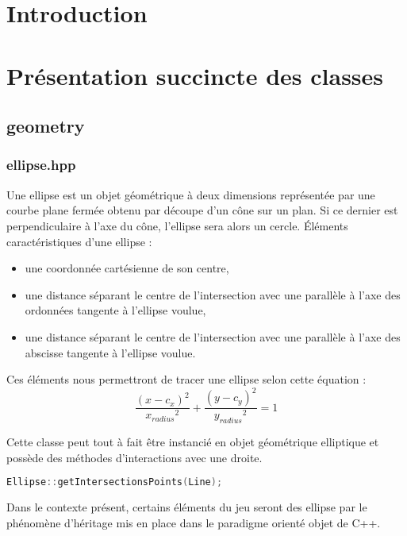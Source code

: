 \documentclass[a4paper,11pt]{report}
\begin{document}

\tableofcontents

\chapter{Introduction}



\chapter[Les classes]{Présentation succincte des classes}
\section[Les objets géométriques]{geometry}

\subsection[Ellipse]{ellipse.hpp}
\begin{center}
\end{center}
Une ellipse est un objet géométrique à deux dimensions représentée par
une courbe plane fermée obtenu par découpe d'un cône sur un plan. Si ce dernier
est perpendiculaire à l'axe du cône, l'ellipse sera alors un cercle.
Éléments caractéristiques d'une ellipse :
\begin{itemize}
	\item une coordonnée cartésienne de son centre,
	\item une distance séparant le centre de l'intersection avec une parallèle à
		l'axe des ordonnées tangente à l'ellipse voulue,
	\item une distance séparant le centre de l'intersection avec une parallèle à
		l'axe des abscisse tangente à l'ellipse voulue.
\end{itemize}
Ces éléments nous permettront de tracer une ellipse selon cette équation :
$$\frac{(x - c_x)^2}{{x_{radius}}^2} + \frac{(y - c_y)^2}{{y_{radius}}^2} = 1$$

Cette classe peut tout à fait être instancié en objet géométrique elliptique
et possède des méthodes d'interactions avec une droite. 
\begin{lstlisting}[frame=single,language=C++]
Ellipse::getIntersectionsPoints(Line);
\end{lstlisting}
Dans le contexte présent, certains éléments du jeu seront des ellipse par le 
phénomène d'héritage mis en place dans le paradigme orienté objet de C++.
\end{document}

